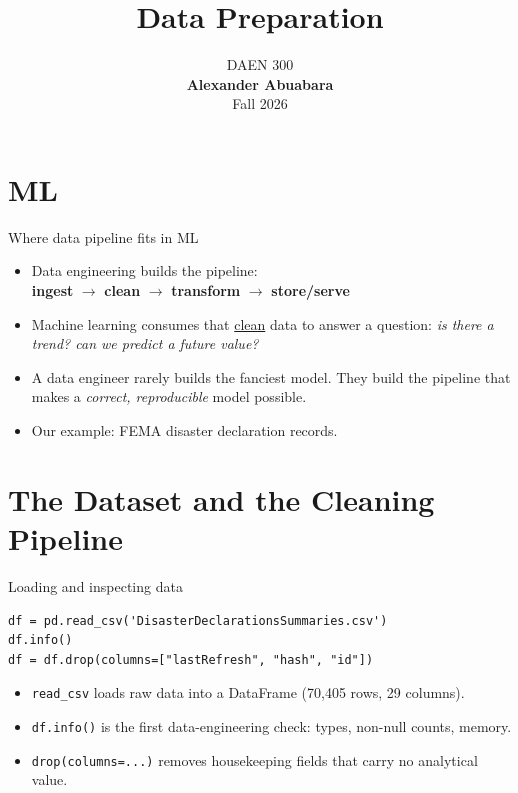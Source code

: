 \documentclass[11pt,aspectratio=43]{beamer}
\title{Data Preparation}
\author{}
\date{
  \textcolor{aggiemaroon}{
    DAEN 300\\
    \textbf{Alexander Abuabara}\\
    Fall 2026
  }
}
\begin{document}
\frame{\titlepage}

\section{ML}

\begin{frame}{Where data pipeline fits in ML}
\begin{itemize}
  \item Data engineering builds the pipeline:\\ \textbf{ingest} $\rightarrow$ \textbf{clean} $\rightarrow$ \textbf{transform} $\rightarrow$ \textbf{store/serve}
  \item Machine learning consumes that \underline{clean} data to answer a question: \textit{is there a trend? can we predict a future value?}
  \item A data engineer rarely builds the fanciest model. They build the pipeline that makes a \emph{correct, reproducible} model possible.
  \item Our example: FEMA disaster declaration records. %
\end{itemize}
\end{frame}

\section{The Dataset and the Cleaning Pipeline}

\begin{frame}[fragile]{Loading and inspecting data}
\begin{lstlisting}
df = pd.read_csv('DisasterDeclarationsSummaries.csv')
df.info()
df = df.drop(columns=["lastRefresh", "hash", "id"])
\end{lstlisting}
\begin{itemize}
  \item \texttt{read\_csv} loads raw data into a DataFrame (70{,}405 rows, 29 columns).
  \item \texttt{df.info()} is the first data-engineering check: types, non-null counts, memory.
  \item \texttt{drop(columns=...)} removes housekeeping fields that carry no analytical value.
\end{itemize}
\end{frame}
\end{document}
